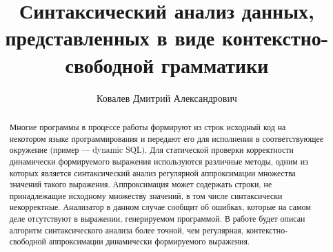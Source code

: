 



\theoremstyle{definition}
\newtheorem{defn}{Определение}
\theoremstyle{proposition}
\newtheorem{prop}{Предложение}

\title{Синтаксический анализ данных, представленных в виде контекстно-свободной грамматики}


\author{Ковалев Дмитрий Александрович}




\maketitle

\begin{abstract}
Многие программы в процессе работы формируют из строк исходный код на некотором языке программирования и передают его для исполнения в соответствующее окружение (пример --- dynamic SQL). Для статической проверки корректности динамически формируемого выражения используются различные методы, одним из которых является синтаксический анализ регулярной аппроксимации множества значений такого выражения. Аппроксимация может содержать строки, не принадлежащие исходному множеству значений, в том числе синтаксически некорректные. Анализатор в данном случае сообщит об ошибках, которые на самом деле отсутствуют в выражении, генерируемом программой. В работе будет описан алгоритм синтаксического анализа более точной, чем регулярная, контекстно-свободной аппроксимации динамически формируемого выражения.
\end{abstract}









%
%

